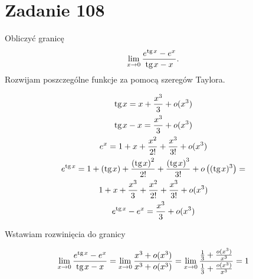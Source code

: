 \documentclass[a4paper,12pt]{article}
\renewcommand{\tg}{\mathrm{tg}\hspace{0.1em}}
\begin{document}
\section*{Zadanie 108}
\noindent
Obliczyć granicę
\[
	\lim_{x \to 0} \frac{e^{\tg x} - e^x}{\tg x - x}
.\] 
\noindent
Rozwijam poszczególne funkcje za pomocą szeregów Taylora.


\begin{gather*}
	\tg x = x + \frac{x^3}{3} + o(x^3) \\
	\tg x - x = \frac{x^3}{3} + o(x^3) \\
	e^x = 1 + x + \frac{x^2}{2!} + \frac{x^3}{3!} + o(x^3) \\
	e^{\tg x} = 1 + \left( \tg x \right) + \frac{\left( \tg x \right)^2 }{2!} + \frac{\left( \tg x \right)^3 }{3!} + o\left( (\tg x)^3 \right) = \\
	1 + x + \frac{x^3}{3} + \frac{x^2}{2!} + \frac{x^3}{3!} + o(x^3) \\
	e^{\tg x} - e^x = \frac{x^3}{3} + o(x^3)
\end{gather*}

\noindent
Wstawiam rozwinięcia do granicy

\begin{gather*}
	\lim_{x \to 0} \frac{e^{\tg x} - e^x}{\tg x - x} = \lim_{x \to 0} \frac{x^3 + o(x^3)}{x^3 + o(x^3)} = \lim_{x \to 0} \frac{\frac{1}{3} + \frac{o(x^3)}{x^3}}{\frac{1}{3} + \frac{o(x^3)}{x^3}} = 1
\end{gather*}
\end{document}
